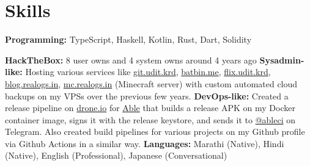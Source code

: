 \documentclass[letterpaper,11pt]{article}
\newcommand{\resumeSubHeadingListStart}{\begin{itemize}[leftmargin=0.15in, label={}]}
\newcommand{\resumeSubHeadingListEnd}{\end{itemize}}
\begin{document}
\section{Skills}
  \vspace{1pt}
  \resumeSubHeadingListStart
    \small{\item{
        \textbf{Programming:}{ TypeScript, Haskell, Kotlin, Rust, Dart, Solidity } \\ \vspace{2pt}
        
        \textbf{HackTheBox:}{ 8 user owns and 4 system owns around 4 years ago}
        \textbf{Sysadmin-like:}{
           Hosting various services like \href{https://git.udit.krd}{\color{blue}git.udit.krd},
           \href{https://batbin.me}{\color{blue}batbin.me},
           \href{https://flix.udit.krd}{\color{blue}flix.udit.krd},
           \href{https://blog.realogs.in}{\color{blue}blog.realogs.in},
           \href{https://mcsrvstat.us/server/mc.realogs.in}{\color{blue}mc.realogs.in}
           (Minecraft server) with custom automated cloud backups on my VPSs over the previous few years.
        }
        \textbf{DevOps-like:}{
          Created a release pipeline on \href{https://drone.io}{\color{blue}drone.io} for \href{https://github.com/uditkarode/AbleMusicPlayer}{\color{blue}Able}
          that builds a release APK on my Docker container image, signs it with the release keystore, and sends it to
          \href{https://t.me/ableci}{\color{blue}@ableci} on Telegram.
          Also created build pipelines for various projects on my Github profile via Github Actions in a similar way.
        }
        \textbf{Languages:}{ Marathi (Native), Hindi (Native), English (Professional), Japanese (Conversational)}
    }}
  \resumeSubHeadingListEnd
\end{document}
